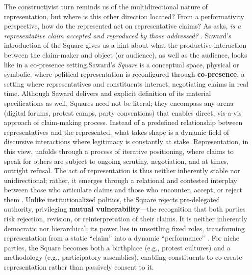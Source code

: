 The constructivist turn \parencite[]{disch2015} reminds us of the multidirectional nature of representation, but where is this other direction located? From a performativity perspective, how do the represented act on representative claims? As \cite{kim2024} asks, \textit{is a representative claim accepted and reproduced by those addressed?} \parencite[4]{kim2024}. Saward's introduction of the Square gives us a hint about what the productive interaction between the claim-maker and object (or audience), as well as the audience, looks like in a co-presence setting.Saward’s \textit{Square} is a conceptual space, physical or symbolic, where political representation is reconfigured through \textbf{co-presence}: a setting where representatives and constituents interact, negotiating claims in real time. Although Saward delivers and explicit definition of its material specifications as well, Squares need not be literal; they encompass any arena (digital forums, protest camps, party conventions) that enables direct, vis-a-vis approach of claim-making process. Instead of a predefined relationship between representatives and the represented, what takes shape is a dynamic field of discursive interactions where legitimacy is constantly at stake. Representation, in this view, unfolds through a process of iterative positioning, where claims to speak for others are subject to ongoing scrutiny, negotiation, and at times, outright refusal. The act of representation is thus neither inherently stable nor unidirectional; rather, it emerges through a relational and contested interplay between those who articulate claims and those who encounter, accept, or reject them \parencite[see 6]{kim2024}.
Unlike institutionalized politics, the Square rejects pre-delegated authority, privileging \textbf{mutual vulnerability}—the recognition that both parties risk rejection, revision, or reinterpretation of their claims. It is neither inherently democratic nor hierarchical; its power lies in unsettling fixed roles, transforming representation from a static \enquote{claim} into a dynamic \enquote{performance} \parencite[5, 11]{saward2024}. For niche parties, the Square becomes both a birthplace (e.g., protest cultures) and a methodology (e.g., participatory assemblies), enabling constituents to co-create representation rather than passively consent to it.

